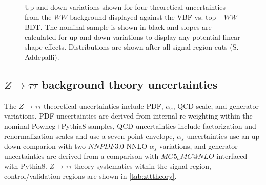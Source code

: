 \begin{figure}[!h]
  \hfill
  \hfill
{\caption{Up and down variations shown for four theoretical uncertainties from the $WW$ background displayed against the VBF vs. top +$WW$ BDT. The nominal sample is shown in black and slopes are calculated for up and down variations to display any potential linear shape effects. Distributions are shown after all signal region cuts (S. Addepalli).
\label{fig:wwtheor}}}
\end{figure}

\subsection{$Z\rightarrow\tau\tau$ background theory uncertainties}

The $Z\rightarrow\tau\tau$ theoretical uncertainties include PDF, $\alpha_s$, QCD scale, and generator variations. PDF uncertainties are derived from internal re-weighting within the nominal Powheg$+$Pythia8 samples, QCD uncertainties include factorization and renormalization scales and use a seven-point envelope, $\alpha_s$ uncertainties use an up-down comparion with two $NNPDF3.0$ NNLO $\alpha_s$ variations, and generator uncertainties are derived from a comparison with $MG5_aMC@NLO$ interfaced with Pythia8. $Z\rightarrow\tau\tau$ theory systematics within the signal region, control/validation regions are shown in \ref{tab:ztttheory}.

